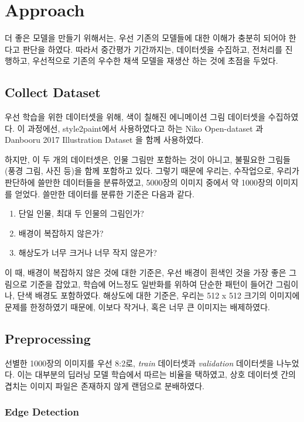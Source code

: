 \section{Approach}

더 좋은 모델을 만들기 위해서는, 우선 기존의 모델들에 대한 이해가 충분히 되어야 한다고 판단을 하였다.
따라서 중간평가 기간까지는, 데이터셋을 수집하고, 전처리를 진행하고, 우선적으로 기존의 우수한 채색 모델을 재생산 하는 것에 초점을 두었다.

\subsection{Collect Dataset}

우선 학습을 위한 데이터셋을 위해, 색이 칠해진 에니메이션 그림 데이터셋을 수집하였다.
이 과정에선, style2paint에서 사용하였다고 하는 Niko Open-dataset \cite{ikuta2016}과 Danbooru 2017 Illustration Dataset \cite{danbooru2017}을 함께 사용하였다.

하지만, 이 두 개의 데이터셋은, 인물 그림만 포함하는 것이 아니고, 불필요한 그림들 (풍경 그림, 사진 등)을 함께 포함하고 있다.
그렇기 때문에 우리는, 수작업으로, 우리가 판단하에 쓸만한 데이터들을 분류하였고, 5000장의 이미지 중에서 약 1000장의 이미지를 얻었다.
쓸만한 데이터를 분류한 기준은 다음과 같다.
\begin{enumerate}[topsep=0pt,itemsep=-1ex,partopsep=1ex,parsep=1ex]
	\item 단일 인물, 최대 두 인물의 그림인가?
	\item 배경이 복잡하지 않은가?
	\item 해상도가 너무 크거나 너무 작지 않은가?
\end{enumerate}
이 때, 배경이 복잡하지 않은 것에 대한 기준은, 우선 배경이 흰색인 것을 가장 좋은 그림으로 기준을 잡았고, 학습에 어느정도 일반화를 위하여 단순한 패턴이 들어간 그림이나, 단색 배경도 포함하였다. 해상도에 대한 기준은, 우리는 512 x 512 크기의 이미지에 문제를 한정하였기 때문에, 이보다 작거나, 혹은 너무 큰 이미지는 배제하였다.

\subsection{Preprocessing}

선별한 1000장의 이미지를 우선 8:2로, \textit{train} 데이터셋과 \textit{validation} 데이터셋을 나누었다.
이는 대부분의 딥러닝 모델 학습에서 따르는 비율을 택하였고, 상호 데이터셋 간의 겹치는 이미지 파일은 존재하지 않게 랜덤으로 분배하였다.

\subsubsection{Edge Detection}

